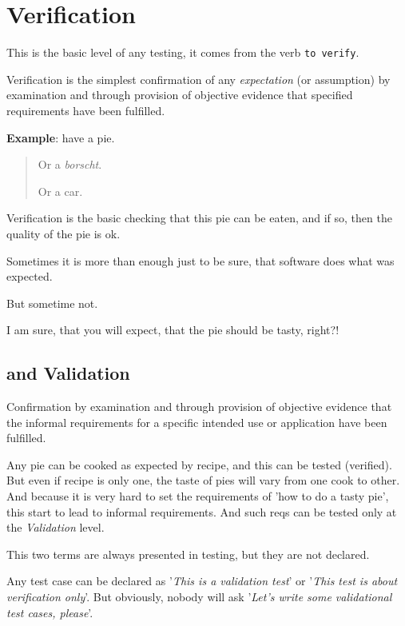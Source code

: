 \section{Verification}
\label{sec:Verification}

This is the basic level of any testing, it comes from the verb \texttt{to verify}.

Verification is the simplest confirmation of any \emph{expectation} (or assumption) by examination and through provision of objective evidence that specified requirements have been fulfilled.

\textbf{Example}: have a pie. 

\begin{quote}
Or a \emph{borscht}. 

Or a car.
\end{quote}

Verification is the basic checking that this pie can be eaten, and if so, then the quality of the pie is ok.

Sometimes it is more than enough just to be sure, that software does what was expected.

But sometime not.

I am sure, that you will expect, that the pie should be tasty, right?!

\subsection{and Validation}
\label{sec:and Validation}

Confirmation by examination and through provision of objective evidence that the informal requirements for a specific intended use or application have been fulfilled. 

Any pie can be cooked as expected by recipe, and this can be tested (verified). But even if recipe is only one, the taste of pies will vary from one cook to other. And because it is very hard to set the requirements of 'how to do a tasty pie', this start to lead to informal requirements. And such reqs can be tested only at the \emph{Validation} level.

This two terms are always presented in testing, but they are not declared. 

Any test case can be declared as '\textit{This is a validation test}' or '\textit{This test is about verification only}'. But obviously, nobody will ask '\textit{Let's write some validational test cases, please}'.
